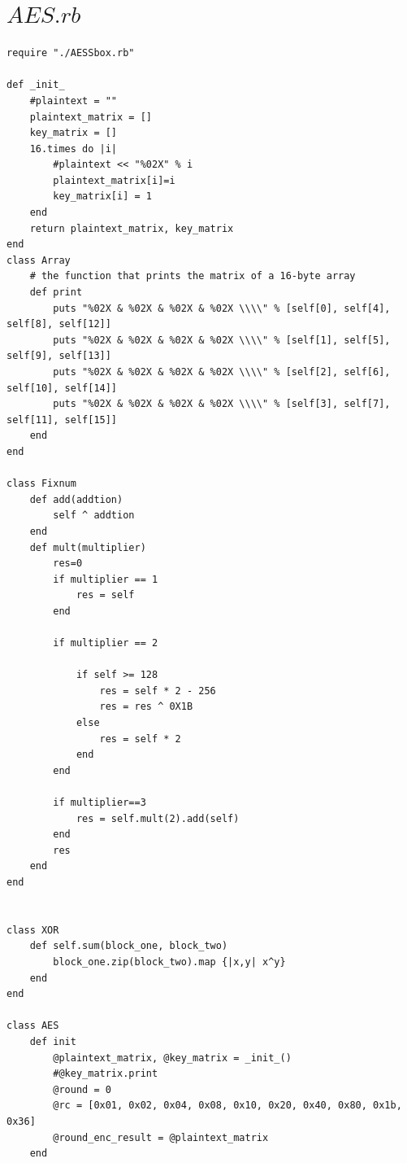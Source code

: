 \documentclass[10pt,a4paper]{article}
\begin{document}
\section{$AES.rb$}
\begin{verbatim}
require "./AESSbox.rb"

def _init_
    #plaintext = ""
    plaintext_matrix = []
    key_matrix = []
    16.times do |i|
        #plaintext << "%02X" % i
        plaintext_matrix[i]=i
        key_matrix[i] = 1
    end
    return plaintext_matrix, key_matrix
end
class Array
    # the function that prints the matrix of a 16-byte array
    def print
        puts "%02X & %02X & %02X & %02X \\\\" % [self[0], self[4], self[8], self[12]]
        puts "%02X & %02X & %02X & %02X \\\\" % [self[1], self[5], self[9], self[13]]
        puts "%02X & %02X & %02X & %02X \\\\" % [self[2], self[6], self[10], self[14]]
        puts "%02X & %02X & %02X & %02X \\\\" % [self[3], self[7], self[11], self[15]]
    end
end

class Fixnum
    def add(addtion)
        self ^ addtion
    end
    def mult(multiplier)
        res=0
        if multiplier == 1
            res = self
        end
        
        if multiplier == 2
            
            if self >= 128
                res = self * 2 - 256
                res = res ^ 0X1B
            else 
                res = self * 2
            end
        end

        if multiplier==3
            res = self.mult(2).add(self)
        end
        res
    end
end


class XOR
    def self.sum(block_one, block_two)
        block_one.zip(block_two).map {|x,y| x^y}
    end
end

class AES
    def init
        @plaintext_matrix, @key_matrix = _init_()
        #@key_matrix.print
        @round = 0
        @rc = [0x01, 0x02, 0x04, 0x08, 0x10, 0x20, 0x40, 0x80, 0x1b, 0x36]
        @round_enc_result = @plaintext_matrix
    end


\end{verbatim}
\end{document}
